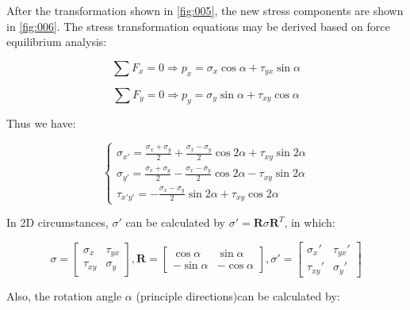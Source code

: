 \documentclass[en,hazy,cyan,8pt,normal]{elegantnote}
\numberwithin{equation}{section}
\begin{document}
    After the transformation shown in \cref{fig:005}, the new stress components are shown in \cref{fig:006}.
    The stress transformation equations may be derived based on force equilibrium analysis:

    \begin{equation}\label{eq:008}
      \sum F_x=0\Rightarrow p_x=\sigma_x\cos\alpha+\tau_{yx}\sin\alpha
    \end{equation}

    \begin{equation}\label{eq:009}
      \sum F_y=0\Rightarrow p_y=\sigma_y\sin\alpha+\tau_{xy}\cos\alpha
    \end{equation}

    Thus we have:

    \begin{equation}\label{eq:010}
      \begin{cases}
        \displaystyle \sigma_{x'}=\frac{\sigma_x+\sigma_y}{2}+\frac{\sigma_x-\sigma_y}{2}\cos2\alpha+\tau_{xy}\sin2\alpha\\
        \displaystyle \sigma_{y'}=\frac{\sigma_x+\sigma_y}{2}-\frac{\sigma_x-\sigma_y}{2}\cos2\alpha-\tau_{xy}\sin2\alpha\\
        \displaystyle \tau_{x'y'}=-\frac{\sigma_x-\sigma_y}{2}\sin2\alpha+\tau_{xy}\cos2\alpha
      \end{cases}
    \end{equation}

    In 2D circumstances, $\sigma'$ can be calculated by $\sigma'=\mathbf{R}\sigma \mathbf{R}^T$, in which:

    \begin{equation}\label{eq:011}
      \sigma=
      \begin{bmatrix}
        \sigma_x & \tau_{yx}\\
        \tau_{xy} & \sigma_y
      \end{bmatrix}, 
      \mathbf{R}=
      \begin{bmatrix}
        \cos\alpha & \sin\alpha\\
        -\sin\alpha & -\cos\alpha
      \end{bmatrix},
      \sigma'=
      \begin{bmatrix}
        \sigma_x' & \tau_{yx}'\\
        \tau_{xy}' & \sigma_y'
      \end{bmatrix}
    \end{equation}

    Also, the rotation angle $\alpha$ (principle directions)can be calculated by:
\end{document}

